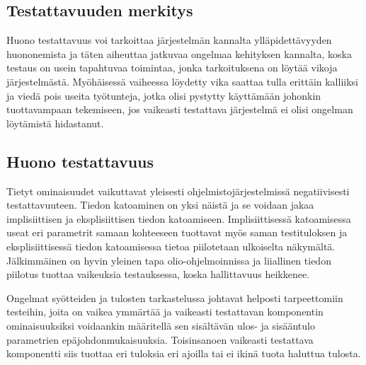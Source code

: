 \documentclass[finnish]{tktltiki2}
\theoremstyle{definition}
\theoremstyle{remark}
\begin{document}
\subsection{Testattavuuden merkitys}
Huono testattavuus voi tarkoittaa järjestelmän kannalta ylläpidettävyyden huononemista ja täten aiheuttaa jatkuvaa ongelmaa kehityksen kannalta, koska testaus on usein tapahtuvaa toimintaa, jonka tarkoituksena on löytää vikoja järjestelmästä. Myöhäisessä vaiheessa löydetty vika saattaa tulla erittäin kalliiksi ja viedä pois useita työtunteja, jotka olisi pystytty käyttämään johonkin tuottavampaan tekemiseen, jos vaikeasti testattava järjestelmä ei olisi ongelman löytämistä hidastanut.

\subsection{Huono testattavuus}

Tietyt ominaisuudet vaikuttavat yleisesti ohjelmistojärjestelmissä negatiivisesti testattavuuteen. Tiedon katoaminen on yksi näistä \citep[s. 20-22]{Voas:1995:STN:624607.625469} ja se voidaan jakaa implisiittisen ja eksplisiittisen tiedon katoamiseen. Implisiittisessä katoamisessa useat eri parametrit samaan kohteeseen tuottavat myös saman testituloksen ja eksplisiittisessä tiedon katoamisessa tietoa piilotetaan ulkoiselta näkymältä. Jälkimmäinen on hyvin yleinen tapa olio-ohjelmoinnissa ja liiallinen tiedon piilotus tuottaa vaikeuksia testauksessa, koska hallittavuus heikkenee. 

Ongelmat syötteiden ja tulosten tarkastelussa johtavat helposti tarpeettomiin testeihin, joita on vaikea ymmärtää \citep[s. 554]{Freedman:1991:TSC:126218.126229} ja vaikeasti testattavan komponentin ominaisuuksiksi voidaankin määritellä sen sisältävän ulos- ja sisääntulo parametrien epäjohdonmukaisuuksia. Toisinsanoen vaikeasti testattava komponentti siis tuottaa eri tuloksia eri ajoilla tai ei ikinä tuota haluttua tulosta.   

\end{document}
